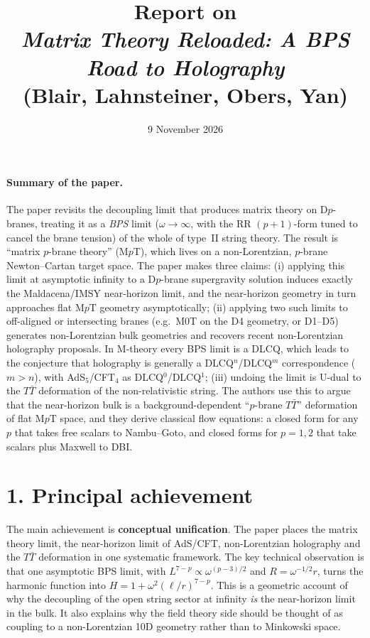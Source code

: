 \documentclass[11pt,a4paper]{article}
\title{Report on\\ \emph{Matrix Theory Reloaded: A BPS Road to Holography}\\[2pt]
\large (Blair, Lahnsteiner, Obers, Yan)}
\date{9 November 2026}
\newcommand{\TTbar}{$T\bar{T}$}
\begin{document}
\maketitle

\paragraph{Summary of the paper.}
The paper revisits the decoupling limit that produces matrix theory on D$p$-branes,
treating it as a \emph{BPS} limit ($\omega\to\infty$, with the RR $(p{+}1)$-form tuned to
cancel the brane tension) of the whole of type~II string theory. The result is
``matrix $p$-brane theory'' (M$p$T), which lives on a non-Lorentzian, $p$-brane
Newton--Cartan target space. The paper makes three claims:
(i) applying this limit at asymptotic infinity to a D$p$-brane supergravity solution
induces exactly the Maldacena/IMSY near-horizon limit, and the near-horizon
geometry in turn approaches flat M$p$T geometry asymptotically;
(ii) applying two such limits to off-aligned or intersecting branes (e.g.\ M0T on the
D4 geometry, or D1--D5) generates non-Lorentzian bulk geometries and
recovers recent non-Lorentzian holography proposals. In M-theory every BPS limit is
a DLCQ, which leads to the conjecture that holography is generally a
DLCQ$^n$/DLCQ$^m$ correspondence ($m>n$), with AdS$_5$/CFT$_4$ as DLCQ$^0$/DLCQ$^1$;
(iii) undoing the limit is U-dual to the \TTbar{} deformation of the non-relativistic
string. The authors use this to argue that the near-horizon bulk is a background-dependent
``$p$-brane \TTbar'' deformation of flat M$p$T space, and they derive classical flow equations:
a closed form for any $p$ that takes free scalars to Nambu--Goto, and closed forms for
$p=1,2$ that take scalars plus Maxwell to DBI.

\section*{1. Principal achievement}
The main achievement is \textbf{conceptual unification}. The paper places the matrix
theory limit, the near-horizon limit of AdS/CFT, non-Lorentzian holography and the
\TTbar{} deformation in one systematic framework. The key technical observation is
that one asymptotic BPS limit, with $L^{7-p}\propto\omega^{(p-3)/2}$ and
$R=\omega^{-1/2}r$, turns the harmonic function into
$H=1+\omega^2(\ell/r)^{7-p}$. This is a geometric account of why the decoupling of
the open string sector at infinity \emph{is} the near-horizon limit in the bulk. It
also explains why the field theory side should be thought of as coupling to a
non-Lorentzian 10D geometry rather than to Minkowski space.
\end{document}
